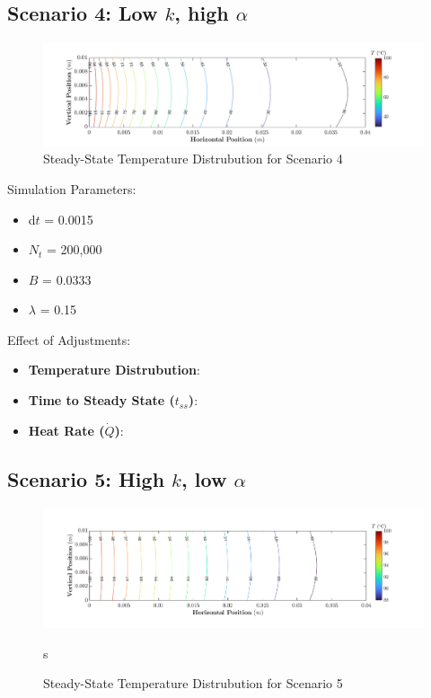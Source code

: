 \documentclass{article}
\begin{document}
\pagebreak

\subsection{Scenario 4: Low $k$, high $\alpha$}

\begin{figure}[h]
    \centering
    \includegraphics[width=1\textwidth]{fig/contour4.png}
    \caption{Steady-State Temperature Distrubution for Scenario 4}
    \label{fig: Plot4}
\end{figure}

Simulation Parameters:
\begin{itemize}
    \item d$t$ = 0.0015
    \item $N_t$ = 200,000
    \item $B$ = $\SI{0.0333}{}$
    \item $\lambda$ = 0.15
\end{itemize}

Effect of Adjustments:
\begin{itemize}
    \item \textbf{Temperature Distrubution}:
    \item \textbf{Time to Steady State ($t_{ss}$)}:
    \item \textbf{Heat Rate ($\dot{Q}$)}:
\end{itemize}

\pagebreak

\subsection{Scenario 5: High $k$, low $\alpha$}

\begin{figure}[h]
    \centering
    \includegraphics[width=1\textwidth]{fig/contour5.png}
    \caption{Steady-State Temperature Distrubution for Scenario 5}s
    \label{fig: Plot5}
\end{figure}
\end{document}
